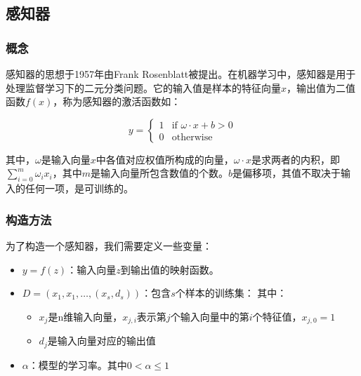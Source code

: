 \documentclass[bachelor,zhspacing]{cqu}  %
\def\tightlist{}
\begin{document}
\subsection{感知器}\label{ux611fux77e5ux5668}

\subsubsection{概念}\label{ux6982ux5ff5}

感知器的思想于1957年由Frank
Rosenblatt被提出。在机器学习中，感知器是用于处理监督学习下的二元分类问题。它的输入值是样本的特征向量\(x\)，输出值为二值函数\(f(x)\)，称为感知器的激活函数如：

\begin{displaymath}
y = \left\{ \begin{array}{ll}
 1 & \textrm{if $\omega \cdot x + b > 0$}\\
 0 & \textrm{otherwise}
  \end{array} \right.
\end{displaymath}

其中，\(\omega\)是输入向量\(x\)中各值对应权值所构成的向量，\(\omega \cdot x\)是求两者的内积，即\(\sum_{i = 0}^{m}\omega_{i}x_{i}\)，其中\(m\)是输入向量所包含数值的个数。\(b\)是偏移项，其值不取决于输入的任何一项，是可训练的。

\subsubsection{构造方法}\label{ux6784ux9020ux65b9ux6cd5}

为了构造一个感知器，我们需要定义一些变量：

\begin{itemize}
\tightlist
\item
  \(y = f(z)\)：输入向量\(z\)到输出值的映射函数。
\item
  \(D = {(x_{1},x_{1},\ldots,(x_{s},d_{s}))}\)：包含\(s\)个样本的训练集：
  其中：

  \begin{itemize}
  \tightlist
  \item
    \(x_{j}\)是n维输入向量，\(x_{j,i}\)表示第\(j\)个输入向量中的第\(i\)个特征值，\(x_{j,0}=1\)
  \item
    \(d_{j}\)是输入向量对应的输出值
  \end{itemize}
\item
  \(\alpha\)：模型的学习率。其中\(0<\alpha\le 1\)
\end{itemize}
\end{document}
